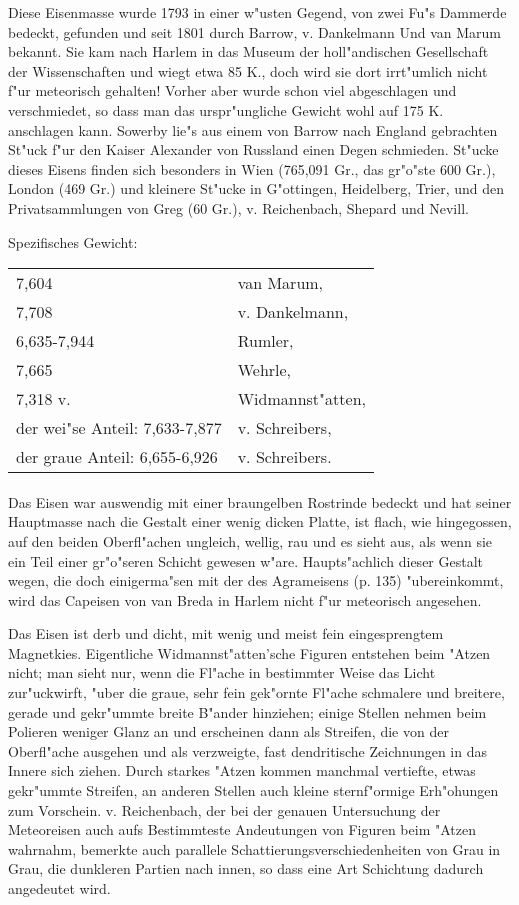 \documentclass[a4paper, 11pt, oneside]{article}
\begin{document}
Diese Eisenmasse wurde 1793 in einer w"usten Gegend, von zwei Fu"s Dammerde bedeckt, gefunden und seit 1801 durch Barrow, v. Dankelmann Und van Marum bekannt. Sie kam nach Harlem in das Museum der holl"andischen Gesellschaft der Wissenschaften und wiegt etwa 85 K., doch wird sie dort irrt"umlich nicht f"ur meteorisch gehalten! Vorher aber wurde schon viel abgeschlagen und verschmiedet, so dass man das urspr"ungliche Gewicht wohl auf 175 K. anschlagen kann. Sowerby lie"s aus einem von Barrow nach England gebrachten St"uck f"ur den Kaiser Alexander von Russland einen Degen schmieden. St"ucke dieses Eisens finden sich besonders in Wien (765,091 Gr., das gr"o"ste 600 Gr.), London (469 Gr.) und kleinere St"ucke in G"ottingen, Heidelberg, Trier, und den Privatsammlungen von Greg (60 Gr.), v. Reichenbach, Shepard und Nevill.

Spezifisches Gewicht:  
\begin{table}[!ht]
    \centering
    \begin{tabular}{l l}
        7,604 & van Marum,\\
        7,708 & v. Dankelmann,\\
        6,635-7,944 & Rumler,\\
        7,665 & Wehrle,\\
        7,318 v. & Widmannst"atten,\\
        der wei"se Anteil: 7,633-7,877 & v. Schreibers,\\
        der graue Anteil: 6,655-6,926 & v. Schreibers.
    \end{tabular}
\end{table}
\paragraph{}
Das Eisen war auswendig mit einer braungelben Rostrinde bedeckt und hat seiner Hauptmasse nach die Gestalt einer wenig dicken Platte, ist flach, wie hingegossen, auf den beiden Oberfl"achen ungleich, wellig, rau und es sieht aus, als wenn sie ein Teil einer gr"o"seren Schicht gewesen w"are. Haupts"achlich dieser Gestalt wegen, die doch einigerma"sen mit der des Agrameisens (p. 135) "ubereinkommt, wird das Capeisen von van Breda in Harlem nicht f"ur meteorisch angesehen.

Das Eisen ist derb und dicht, mit wenig und meist fein eingesprengtem Magnetkies. Eigentliche Widmannst"atten'sche Figuren entstehen beim "Atzen nicht; man sieht nur, wenn die Fl"ache in bestimmter Weise das Licht zur"uckwirft, "uber die graue, sehr fein gek"ornte Fl"ache schmalere und breitere, gerade und gekr"ummte breite B"ander hinziehen; einige Stellen nehmen beim Polieren weniger Glanz an und erscheinen dann als Streifen, die von der Oberfl"ache ausgehen und als verzweigte, fast dendritische Zeichnungen in das Innere sich ziehen. Durch starkes "Atzen kommen manchmal vertiefte, etwas gekr"ummte Streifen, an anderen Stellen auch kleine sternf"ormige Erh"ohungen zum Vorschein. v. Reichenbach, der bei der genauen Untersuchung der Meteoreisen auch aufs Bestimmteste Andeutungen von Figuren beim "Atzen wahrnahm, bemerkte auch parallele Schattierungsverschiedenheiten von Grau in Grau, die dunkleren Partien nach innen, so dass eine Art Schichtung dadurch angedeutet wird.
\end{document}
